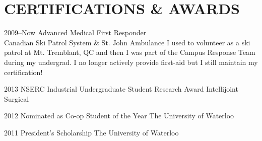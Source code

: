 \documentclass[a4paper,nocolors]{cv-friggeri-ben}
\begin{document}

\section{CERTIFICATIONS \& AWARDS}

\begin{entrylist}

\entry
    {2009--Now}
    {Advanced Medical First Responder}
    {\\Canadian Ski Patrol System \& St. John Ambulance}
    {I used to volunteer as a ski patrol at Mt. Tremblant, QC and then I was part of the Campus Response Team during my undergrad. I no longer actively provide first-aid but I still maintain my certification!}


\entry
    {2013}
    {NSERC Industrial Undergraduate Student Research Award}
    {Intellijoint Surgical}
    {\vspace{-10pt}}

\entry
    {2012}
    {Nominated as Co-op Student of the Year}
    {The University of Waterloo}
    {\vspace{-10pt}}

\entry
    {2011}
    {President's Scholarship}
    {The University of Waterloo}
    {\vspace{-10pt}}

\end{entrylist}
\end{document}
